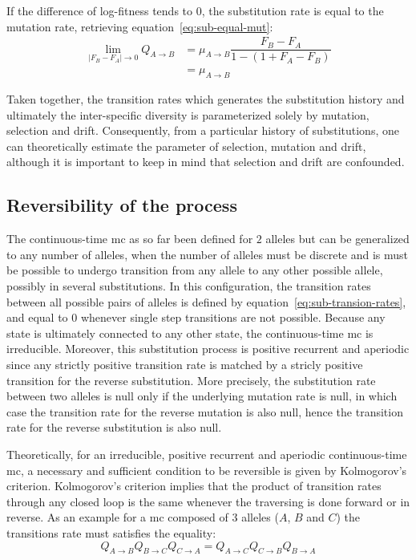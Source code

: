 If the difference of log-fitness tends to $0$, the \gls{substitution} rate is equal to the mutation rate, retrieving equation~\ref{eq:sub-equal-mut}:
\begin{align}
    \lim_{|F_{B} - F_{A}| \to 0} Q_{A \to B} & = \mu_{A \to B}   \dfrac{F_{B} - F_{A}}{{1 - (1 + {F_{A} - F_{B}}) }} \nonumber \\
    & =  \mu_{A \to B}
\end{align}

Taken together, the {transition} rates which generates the \gls{substitution} history and ultimately the inter-specific diversity is parameterized solely by mutation, selection and drift.
Consequently, from a particular history of \glspl{substitution}, one can theoretically estimate the parameter of selection, mutation and drift, although it is important to keep in mind that selection and drift are confounded.

\subsection{Reversibility of the process}
The continuous-time \gls{mc} as so far been defined for $2$ \glspl{allele} but can be generalized to any number of \glspl{allele}, when the number of \glspl{allele} must be discrete and is must be possible to undergo {transition} from any \gls{allele} to any other possible \gls{allele}, possibly in several \glspl{substitution}.
In this configuration, the {transition} rates between all possible pairs of \glspl{allele} is defined by equation~\ref{eq:sub-transion-rates}, and equal to $0$ whenever single step {transitions} are not possible.
Because any state is ultimately connected to any other state, the continuous-time \gls{mc} is irreducible.
Moreover, this \gls{substitution} process is positive recurrent and aperiodic since any strictly positive {transition} rate is matched by a stricly positive {transition} for the reverse \gls{substitution}.
More precisely, the \gls{substitution} rate between two \glspl{allele} is null only if the underlying mutation rate is null, in which case the {transition} rate for the reverse mutation is also null, hence the {transition} rate for the reverse \gls{substitution} is also null.

Theoretically, for an irreducible, positive recurrent and aperiodic continuous-time \gls{mc}, a necessary and sufficient condition to be reversible is given by Kolmogorov's criterion.
Kolmogorov's criterion implies that the product of {transition} rates through any closed loop is the same whenever the traversing is done forward or in reverse.
As an example for a \gls{mc} composed of $3$ \glspl{allele} ($A$, $B$ and $C$) the {transitions} rate must satisfies the equality:
\begin{equation}
    Q_{A \to B}Q_{B \to C}Q_{C \to A} = Q_{A \to C}Q_{C \to B}Q_{B \to A}
\end{equation}

